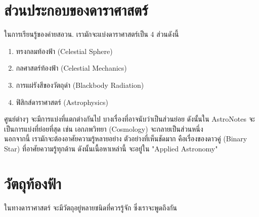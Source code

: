 \documentclass[12pt, a4paper, oneside]{article}
\begin{document}
\section{ส่วนประกอบของดาราศาสตร์}
ในการเรียนรู้ของค่ายสอวน. เรามักจะแบ่งดาราศาสตร์เป็น 4 ส่วนดังนี้
\begin{enumerate}
    \item ทรงกลมท้องฟ้า (Celestial Sphere)
    \item กลศาสตร์ท้องฟ้า (Celestial Mechanics)
    \item การแผ่รังสีของวัตถุดำ (Blackbody Radiation)
    \item ฟิสิกส์ดาราศาสตร์ (Astrophysics)
\end{enumerate}
ศูนย์ต่างๆ จะมีการแบ่งที่แตกต่างกันไป บางเรื่องที่อาจนับว่าเป็นส่วนย่อย ดังนั้นใน AstroNotes จะเป็นการแบ่งที่ย่อยที่สุด เช่น เอกภพวิทยา (Cosmology) จะกลายเป็นส่วนหนึ่ง \\
นอกจากนี้ เรามักจะต้องอาศัยความรู้หลายอย่าง ตัวอย่างที่เห็นชัดมาก คือเรื่องของดาวคู่ (Binary Star) ที่อาศัยความรู้ทุกด้าน ดังนั้นเนื้อหาเหล่านี้ จะอยู่ใน "Applied Astronomy"

\section{วัตถุท้องฟ้า}
ในทางดาราศาสตร์ จะมีวัตถุอยู่หลายชนิดที่ควรรู้จัก ซึ่งเราจะพูดถึงกัน
\end{document}
